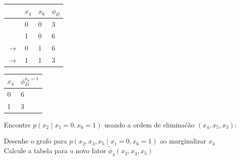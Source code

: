 \begin{exenumerate}
\begin{solution}
\begin{center}
        \end{center}
        
        \begin{center}
            \begin{tabular}{llll}
                \toprule
                & $x_4$ & $x_6$ & $\phi_D$\\
                \midrule
                & 0 & 0 & 3 \\
                & 1 & 0 & 6 \\
                $\rightarrow$ & 0 & 1 & 6 \\
                $\rightarrow$ & 1 & 1 & 3 \\
                \bottomrule
            \end{tabular}
            \hspace{3ex}  \hspace{3ex}
            \begin{tabular}{ll}
                \toprule
                $x_4$ & $\phi_D^{x_6=1}$\\
                \midrule
                0 & 6 \\
                1 & 3 \\
                \bottomrule
            \end{tabular}
        \end{center}
        
    \end{solution}
    
    \item Encontre $p(x_2 \mid x_1=0, x_6=1)$ usando a ordem de elimina\'c\~ao $(x_4, x_5, x_3)$:
    
    \begin{exenumerate}
        \item Desenhe o grafo para $p(x_2, x_3, x_5 \mid x_1=0, x_6=1)$ ao marginalizar $x_4$ \\
        Calcule a tabela para o novo fator $\tilde{\phi}_4(x_2, x_3, x_5)$ \\
        

\end{exenumerate}
\end{exenumerate}
